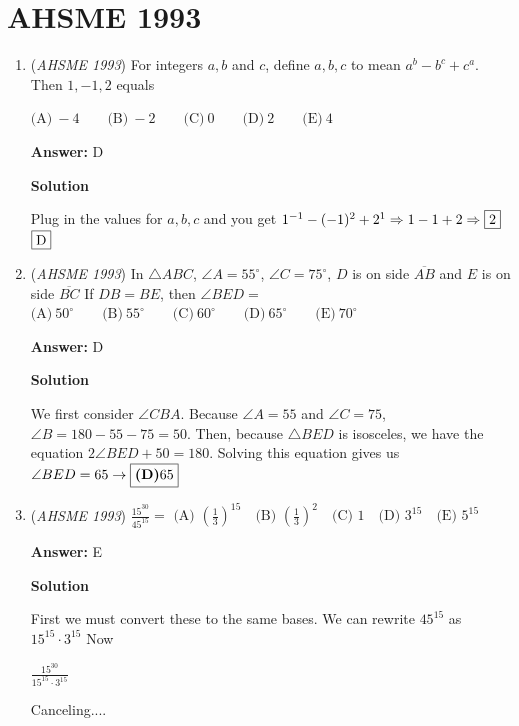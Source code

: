 \section{AHSME 1993}
        \begin{enumerate}
        	\item (\textit{AHSME 1993}) For integers $a, b$ and $c$, define $\boxed{a,b,c}$ to mean $a^b-b^c+c^a$. Then $\boxed{1,-1,2}$ equals


 $\text{(A)} \ -4 \qquad \text{(B)} \ -2 \qquad \text{(C)} \ 0 \qquad \text{(D)} \ 2 \qquad \text{(E)} \ 4$

 \textbf{Answer: }D



\textbf{Solution}

Plug in the values for $a,b,c$ and you get $1^{-1} - (-1)^2 + 2^1 \Rightarrow 1-1+2 \Rightarrow \fbox{2}$
$\fbox{D}$



	\item (\textit{AHSME 1993}) In $\triangle ABC$, $\angle A=55^\circ$, $\angle C=75^\circ$, $D$ is on side $\overline{AB}$ and $E$ is on side $\overline{BC}$ If $DB=BE$, then $\angle BED=$
$\text{(A)}\ 50^\circ \qquad \text{(B)}\ 55^\circ \qquad \text{(C)}\ 60^\circ \qquad \text{(D)}\ 65^\circ \qquad \text{(E)}\ 70^\circ$

 \textbf{Answer: }D



\textbf{Solution}

We first consider $\angle CBA$. Because $\angle A = 55$ and $\angle C = 75$, $\angle B = 180 - 55 - 75 = 50$. Then, because $\triangle BED$ is isosceles, we have the equation $2 \angle BED + 50 = 180$. Solving this equation gives us $\angle BED = 65 \rightarrow \fbox{\textbf{(D)}65}$



	\item (\textit{AHSME 1993}) $\frac{15^{30}}{45^{15}} =$
$\text{(A) } \left(\frac{1}{3}\right)^{15}\quad \text{(B) } \left(\frac{1}{3}\right)^{2}\quad \text{(C) } 1\quad \text{(D) } 3^{15}\quad \text{(E) } 5^{15}$

 \textbf{Answer: }E



\textbf{Solution}

First we must convert these to the same bases. We can rewrite $45^{15}$ as $15^{15} \cdot 3^{15}$ Now

 $\frac{15^{30}}{15^{15} \cdot 3^{15}}$ 

 Canceling.... 


\end{enumerate}
